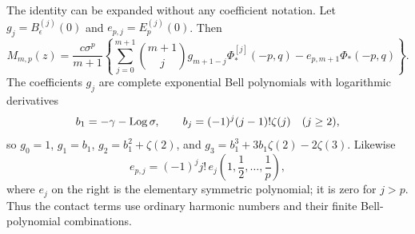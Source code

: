 The identity can be expanded without any coefficient notation.
Let $g_j=B_\epsilon^{(j)}(0)$ and $e_{p,j}=E_p^{(j)}(0)$. Then
\begin{equation}\label{res:expanded}
 M_{m,p}(z)=\frac{c\sigma^p}{m+1}
 \left\{\sum_{j=0}^{m+1}\binom{m+1}{j}
     g_{m+1-j}\Phi_*^{[j]}(-p,q)
                 -e_{p,m+1}\Phi_*(-p,q)\right\}.
\end{equation}
The coefficients $g_j$ are complete exponential Bell polynomials
with logarithmic derivatives
\[
 b_1=-\gamma-\operatorname{Log}\sigma,\qquad
 b_j=(-1)^j(j-1)!\zeta(j)\quad(j\ge2),
\]
so $g_0=1$, $g_1=b_1$, $g_2=b_1^2+\zeta(2)$, and
$g_3=b_1^3+3b_1\zeta(2)-2\zeta(3)$.
Likewise
\begin{equation}\label{res:contactcoeff}
 e_{p,j}=(-1)^j j!\,
 e_j\left(1,\frac12,\ldots,\frac1p\right),
\end{equation}
where $e_j$ on the right is the elementary symmetric polynomial;
it is zero for $j>p$. Thus the contact terms use ordinary harmonic
numbers and their finite Bell-polynomial combinations.

